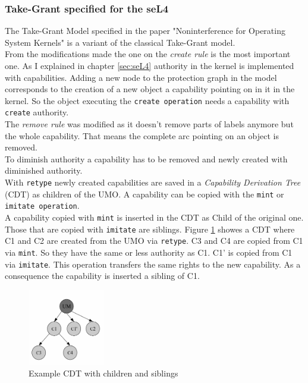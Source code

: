 \documentclass[pdftex,11pt,a4paper,twoside]{article}
\begin{document}
	\subsubsection{Take-Grant specified for the seL4}
	The Take-Grant Model specified in the paper "Noninterference for Operating System Kernels" \cite{TakeG} is a variant of the classical Take-Grant model. \\
	From the modifications made the one on the \textit{create rule} is the most important one. As I explained in chapter \ref{sec:seL4} authority in the kernel is implemented with capabilities. Adding a new node to the protection graph in the model corresponds to the creation of a new object a capability pointing on in it in the kernel. So the object executing the \texttt{create operation} needs a capability with \texttt{create} authority. \\
	The \textit{remove rule} was modified as it doesn't remove parts of labels anymore but the whole capability. That means the complete arc pointing on an object is removed. \\
	To diminish authority a capability has to be removed and newly created with diminished authority. \\
	With \texttt{retype} newly created capabilities are saved in a \textit{Capability Derivation Tree} (CDT) as children of the UMO. A capability can be copied with the \texttt{mint} or \texttt{imitate operation}. \\ 
	A capability  copied with \texttt{mint} is inserted in the CDT as Child of the original one. Those that are copied with \texttt{imitate} are siblings. Figure \ref{fig:cdt} showes a CDT where C1 and C2 are created from the UMO via \texttt{retype}. C3 and C4 are copied from C1 via \texttt{mint}. So they have the same or less authority as C1. C1' is copied from C1 via \texttt{imitate}. This operation transfers the same rights to the new capability. As a consequence the capability is inserted a sibling of C1. \\
	 \begin{figure}[H]
	\centering
		\includegraphics[width=0.3\textwidth]{./Pictures/CDT.jpg}
	\caption[CDT]{Example CDT with children and siblings \cite{PhDseL4}}
	\label{fig:cdt}
	\end{figure}
\end{document}
